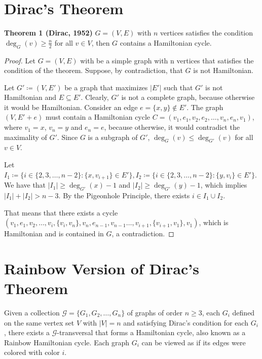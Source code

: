 \section{Dirac's Theorem}

\textbf{Theorem 1 (Dirac, 1952)} $G = (V, E)$ with $n$ vertices satisfies the condition $\deg_G(v) \geq \frac{n}{2}$ for all $v \in V$, 
then $G$ contains a Hamiltonian cycle.

\begin{proof}
    Let $G = (V, E)$ with be a simple graph with n vertices that satisfies the condition of the theorem. Suppose, 
    by contradiction, that $G$ is not Hamiltonian. 

    Let $G' \coloneqq (V, E')$ be a graph that maximizes $|E'|$ such that $G'$ is not Hamiltonian and $E \subseteq E'$. 
    Clearly, $G'$ is not a complete graph, because otherwise it would be Hamiltonian. Consider an edge $e = \{x, y\} \not\in E'$.
    The graph $(V, E' + e)$ must contain a Hamiltonian cycle $C = (v_1, e_1, v_2, e_2, \ldots, v_n, e_{n}, v_1)$, where 
    $v_1 = x$, $v_n = y$ and $e_n = e$, because otherwise, it would contradict the maximality of $G'$.
    Since $G$ is a subgraph of $G'$, $\deg_G(v) \leq \deg_{G'}(v)$ for all $v \in V$.

    Let $I_1 \coloneqq \{i \in \{2, 3, \dots, n-2\} : \{x, v_{i+1}\} \in E'\}, 
    I_2 \coloneqq \{ i \in \{2, 3, \dots, n - 2\} : \{y, v_{i}\} \in E' \}$.
    We have that $|I_1| \geq \deg_{G'}(x) - 1$ and $|I_2| \geq \deg_{G'}(y) - 1$,
    which implies $|I_1| + |I_2| > n - 3$. By the Pigeonhole Principle, there exists $i \in I_1 \cup I_2$.

    That means that there exists a cycle 
    $(v_1, e_1, v_2, \dots, v_i, \{v_i, v_n\}, v_n, e_{n - 1}, v_{n-1} \dots , v_{i+1}, \{v_{i+1}, v_1\}, v_1)$, 
    which is Hamiltonian and is contained in $G$, a contradiction.

\end{proof}

\section{Rainbow Version of Dirac's Theorem}

Given a collection $\mathcal{G} = \{G_1, G_2, \ldots, G_n\}$ of graphs of order $n \geq 3$, each $G_i$ defined
on the same vertex set $V$ with $|V| = n$ and satisfying Dirac's condition for each $G_i$, there exists a 
$\mathcal{G}$-transversal that forms a Hamiltonian cycle, also known as a Rainbow Hamiltonian cycle.
Each graph $G_i$ can be viewed as if its edges were colored with color $i$.